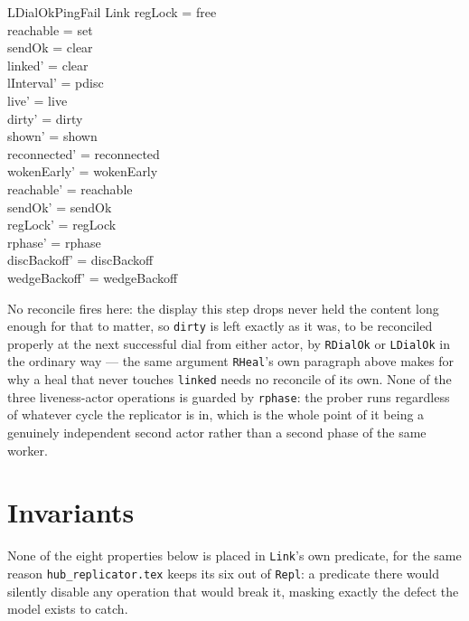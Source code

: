 \documentclass[a4paper,10pt,fleqn]{article}
\begin{document}
\begin{schema}{LDialOkPingFail}
  \Delta Link
\where
  regLock = free \\
  reachable = set \\
  sendOk = clear \\
  linked' = clear \\
  lInterval' = pdisc \\
  live' = live \\ dirty' = dirty \\ shown' = shown \\
  reconnected' = reconnected \\ wokenEarly' = wokenEarly \\
  reachable' = reachable \\ sendOk' = sendOk \\ regLock' = regLock \\
  rphase' = rphase \\
  discBackoff' = discBackoff \\ wedgeBackoff' = wedgeBackoff
\end{schema}

No reconcile fires here: the display this step drops never held the
content long enough for that to matter, so \texttt{dirty} is left exactly
as it was, to be reconciled properly at the next successful dial from
either actor, by \texttt{RDialOk} or \texttt{LDialOk} in the ordinary way
--- the same argument \texttt{RHeal}'s own paragraph above makes for why
a heal that never touches \texttt{linked} needs no reconcile of its own.
None of the three liveness-actor operations is guarded by \texttt{rphase}:
the prober runs regardless of whatever cycle the replicator is in, which
is the whole point of it being a genuinely independent second actor
rather than a second phase of the same worker.

\section{Invariants}
\label{sec:inv}

None of the eight properties below is placed in \texttt{Link}'s own
predicate, for the same reason \texttt{hub\_replicator.tex} keeps its six
out of \texttt{Repl}: a predicate there would silently disable any
operation that would break it, masking exactly the defect the model exists
to catch.
\end{document}
